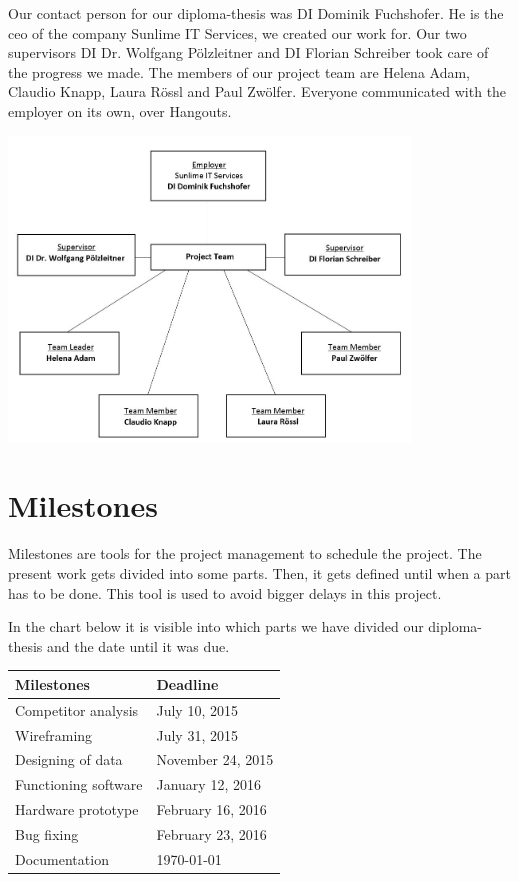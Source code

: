 Our contact person for our diploma-thesis was DI Dominik Fuchshofer. He is the \gls{ceo} of the company Sunlime IT Services, we created our work for. Our two supervisors DI Dr. Wolfgang Pölzleitner and DI Florian Schreiber took care of the progress we made. The members of our project team are Helena Adam, Claudio Knapp, Laura Rössl and Paul Zwölfer. Everyone communicated with the employer on its own, over Hangouts.
\begin{center}
\includegraphics[width=0.8\textwidth] {bilder/projectdiagram}
\end{center}
\clearpageauthor
\newpage
\section{Milestones}
Milestones are tools for the project management to schedule the project. The present work gets divided into some parts. Then, it gets defined until when a part has to be done. This tool is used to avoid bigger delays in this project.\newline

In the chart below it is visible into which parts we have divided our diploma-thesis and the date until it was due.\newline
\begin{center}
\begin{tabular}{p{5cm}p{5cm}}
\toprule
\textbf{Milestones} & \textbf{Deadline} \\
\midrule
Competitor analysis & July 10, 2015 \\
Wireframing & July 31, 2015 \\
Designing of data & November 24, 2015 \\
Functioning software & January 12, 2016 \\
Hardware prototype & February 16, 2016 \\
Bug fixing & February 23, 2016 \\
Documentation & \today \\
\bottomrule
\end{tabular}
\end{center}
\newpage
